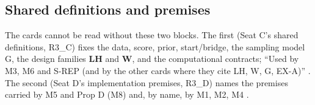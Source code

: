\subsection{Shared definitions and premises}\label{sec:theory-shared}

The cards cannot be read without these two blocks. The first (Seat C's shared definitions, R3\_C) fixes the data, score, prior, start/bridge, the sampling model G, the design families \textbf{LH} and \textbf{W}, and the computational contracts; ``Used by M3, M6 and S-REP (and by the other cards where they cite LH, W, G, EX-A)'' . The second (Seat D's implementation premises, R3\_D) names the premises carried by M5 and Prop D (M8) and, by name, by M1, M2, M4 .

